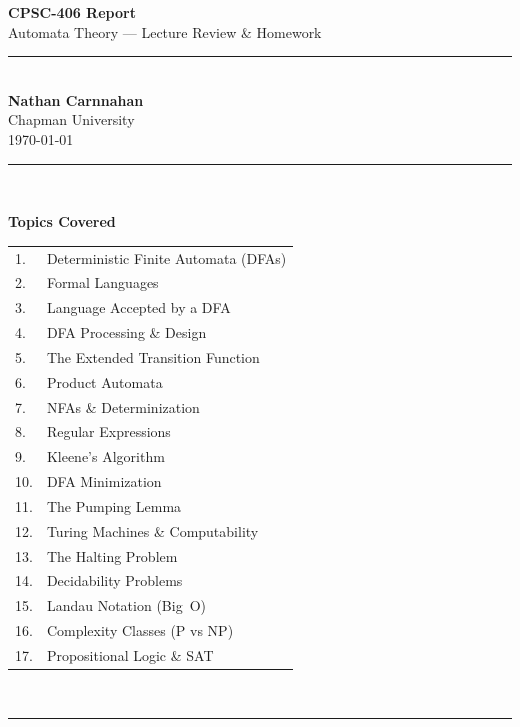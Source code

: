 \documentclass[11pt, a4paper]{article}
\theoremstyle{definition}
\theoremstyle{remark}
\begin{document}

\begin{titlepage}
  \centering
  \vspace*{3cm}
  {\Huge\bfseries\color{accent} CPSC-406 Report}\\[0.8em]
  {\LARGE Automata Theory --- Lecture Review \& Homework}\\[2em]
  \rule{0.5\linewidth}{1pt}\\[2em]
  {\large
    \textbf{Nathan Carnnahan}\\[0.4em]
    Chapman University\\[2em]
    \today
  }\\[2em]
  \rule{0.5\linewidth}{1pt}\\[2em]
  {\large
    \textbf{Topics Covered}\\[0.6em]
    \begin{tabular}{ll}
      1.  & Deterministic Finite Automata (DFAs) \\
      2.  & Formal Languages \\
      3.  & Language Accepted by a DFA \\
      4.  & DFA Processing \& Design \\
      5.  & The Extended Transition Function \\
      6.  & Product Automata \\
      7.  & NFAs \& Determinization \\
      8.  & Regular Expressions \\
      9.  & Kleene's Algorithm \\
      10. & DFA Minimization \\
      11. & The Pumping Lemma \\
      12. & Turing Machines \& Computability \\
      13. & The Halting Problem \\
      14. & Decidability Problems \\
      15. & Landau Notation (Big~O) \\
      16. & Complexity Classes (P vs NP) \\
      17. & Propositional Logic \& SAT \\
    \end{tabular}
  }\\[2em]
  \rule{0.5\linewidth}{1pt}
\end{titlepage}

\setcounter{tocdepth}{3}
\tableofcontents
\clearpage
\end{document}

